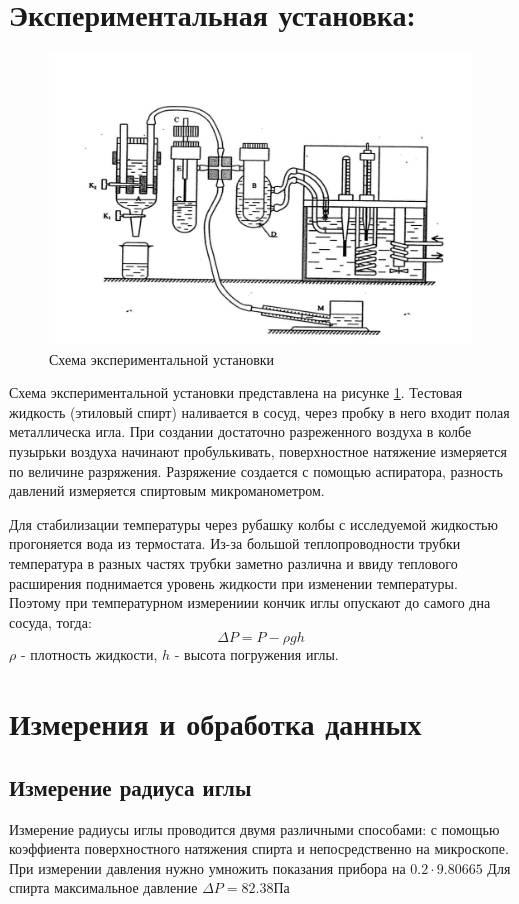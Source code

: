 \documentclass[a4paper,12pt]{article}
\begin{document}
\section{Экспериментальная установка:}
\begin{figure}[H]
    \center
    \includegraphics[width=\linewidth]{data/установка.jpg}
    \caption{Схема экспериментальной установки}\label{установка}
\end{figure}
Схема экспериментальной установки представлена на рисунке \ref{установка}.
Тестовая жидкость (этиловый спирт) наливается в сосуд, через пробку в него входит полая металлическа игла. При создании достаточно разреженного воздуха в колбе пузырьки воздуха начинают пробулькивать, поверхностное натяжение измеряется по величине разряжения. Разряжение создается с помощью аспиратора, разность давлений измеряется спиртовым микроманометром.

Для стабилизации температуры через рубашку колбы с исследуемой жидкостью прогоняется вода из термостата. Из-за большой теплопроводности трубки температура в разных частях трубки заметно различна и ввиду теплового расширения поднимается уровень жидкости при изменении температуры. Поэтому при температурном измерениии кончик иглы опускают до самого дна сосуда, тогда:
\begin{equation}
    \Delta P = P - \rho g h
\end{equation}
$\rho$ - плотность жидкости, $h$ - высота погружения иглы.

\section{Измерения и обработка данных}
\subsection*{Измерение радиуса иглы}
Измерение радиусы иглы проводится двумя различными способами: с помощью коэффиента поверхностного натяжения спирта и непосредственно на микроскопе.
При измерении давления нужно умножить показания прибора на $0.2\cdot 9.80665$
Для спирта максимальное давление $\Delta P = 82.38Па$
\end{document}
